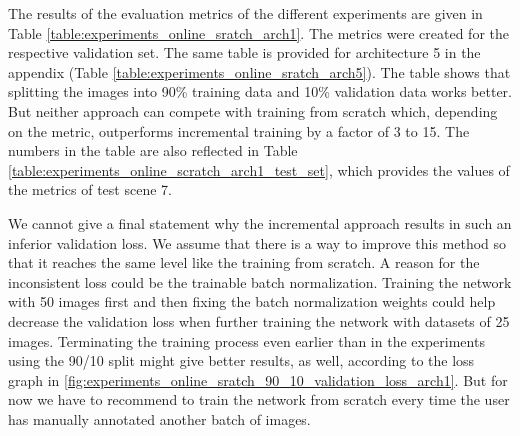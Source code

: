 The results of the evaluation metrics of the different experiments are given in Table \ref{table:experiments_online_sratch_arch1}. The metrics were created for the respective validation set. The same table is provided for architecture 5 in the appendix (Table \ref{table:experiments_online_sratch_arch5}). The table shows that splitting the images into 90\% training data and 10\% validation data works better. But neither approach can compete with training from scratch which, depending on the metric, outperforms incremental training by a factor of 3 to 15. The numbers in the table are also reflected in Table \ref{table:experiments_online_scratch_arch1_test_set}, which provides the values of the metrics of test scene 7.

We cannot give a final statement why the incremental approach results in such an inferior validation loss. We assume that there is a way to improve this method so that it reaches the same level like the training from scratch. A reason for the inconsistent loss could be the trainable batch normalization. Training the network with 50 images first and then fixing the batch normalization weights could help decrease the validation loss when further training the network with datasets of 25 images. Terminating the training process even earlier than in the experiments using the 90/10 split might give better results, as well, according to the loss graph in \fig \ref{fig:experiments_online_sratch_90_10_validation_loss_arch1}. But for now we have to recommend to train the network from scratch every time the user has manually annotated another batch of images.

